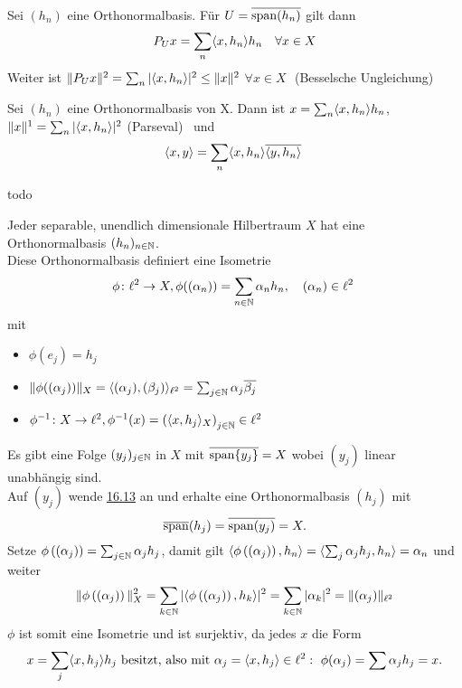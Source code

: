 \begin{satz}
	Sei $(h_{n})$ eine Orthonormalbasis. Für $U = \overline{\operatorname{span}(h_{n})}$ gilt dann
		\[ P_{U} x = \sum_{n} \langle x, h_{n} \rangle h_{n} \quad \forall x \in X \]
	Weiter ist $\| P_{U} x \|^{2} = \sum_{n} | \langle x , h_{n} \rangle |^{2} \leq \| x \|^{2}$ $\forall x \in X$ $ $ (Besselsche Ungleichung) 
\end{satz}


\begin{kor}
	Sei $(h_{n})$ eine Orthonormalbasis von X. Dann ist $x = \sum_{n} \langle x, h_{n} \rangle h_{n}$, $\| x \|^{1} = \sum_{n} | \langle x, h_{n} \rangle |^{2}$ (Parseval)  und
		\[ \< x , y \> = \sum_{n} \< x, h_{n} \> \overline{\< y , h_{n} \>} \]
\end{kor}

\begin{beweis}
	todo
\end{beweis}


\setcounter{satz}{12} %
\begin{satz}
	Jeder separable, unendlich dimensionale Hilbertraum $X$ hat eine Orthonormalbasis $(h_{n})_{n \in \mathbb{N}}	$. \\
	Diese Orthonormalbasis definiert eine Isometrie
		\[ \phi \colon \ell^{2} \rightarrow X, \phi( (\alpha_{n}) ) = \sum_{n \in \MdN} \alpha_{n} h_{n}, \quad (\alpha_{n}) \in \ell^{2} \]
	mit 
	\begin{itemize}
		\item $\phi( e_{j} ) = h_{j}$
		\item $\| \phi( (\alpha_{j}) ) \|_{X} = \langle (\alpha_{j}),(\beta_{j}) \rangle_{\ell^{2}} = \sum_{j \in \mathbb{N}} \alpha_{j} \overline{\beta_{j}}$
		\item $\phi^{-1} \colon X \rightarrow \ell^{2}, \phi^{-1}(x) = \left( \langle x, h_{j} \rangle_{X} \right)_{j \in \mathbb{N}} \in \ell^{2}$
	\end{itemize}
\end{satz}

\begin{beweis}
	Es gibt eine Folge $(y_{j})_{j \in \mathbb{N}}$ in $X$ mit $\overline{\operatorname{span}\{ y_{j} \}} = X$ wobei $(y_{j})$ linear unabhängig sind. \\
	Auf $(y_{j})$ wende \hyperref[satz:13.6-Orthogonalzerlegung]{16.13} an und erhalte eine Orthonormalbasis $(h_{j})$ mit 
		\[ \overline{\operatorname{span}}(h_{j}) = \overline{\operatorname{span}(y_{j})} = X. \]
	Setze $\phi \left( (\alpha_{j}) \right) = \sum_{j \in \mathbb{N}} \alpha_{j} h_{j}$, damit gilt $\langle \phi \left( (\alpha_{j}) \right) , h_{n} \rangle = \langle \sum_{j} \alpha_{j} h_{j}, h_{n} \rangle = \alpha_{n}$ und weiter
	 \[ \| \phi \left( (\alpha_{j}) \right)  \|^{2}_{X} = \sum_{k \in \mathbb{N}} | \langle \phi \left( (\alpha_{j}) \right), h_{k} \rangle |^{2} = \sum_{k \in \mathbb{N}} | \alpha_{k} |^{2} = \| (\alpha_{j}) \|_{\ell^{2}} \]
	$\phi$ ist somit eine Isometrie und ist surjektiv, da jedes $x$ die Form
	\[ x = \sum_{j} \langle x, h_{j} \rangle h_{j} \text{ besitzt, also mit }\alpha_{j} = \langle x, h_{j} \rangle \in \ell^{2}: \text{ } \phi(\alpha_{j} ) = \sum \alpha_{j} h_{j} = x. \]
\end{beweis}



\newpage